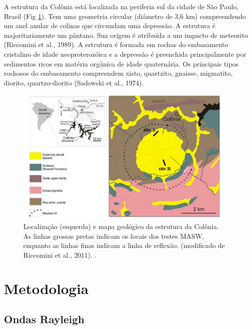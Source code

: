 \documentclass[smallextended]{svjour3}       %
\begin{document}
A estrutura da Colônia está localizada na periferia sul da cidade de São Paulo, Brasil (Fig \ref{geologia}). Tem uma geometria circular (diâmetro de 3,6 km) compreendendo um anel anular de colinas que circundam uma depressão. A estrutura é majoritariamente um pântano. Sua origem é atribuída a um impacto de meteorito (Riccomini et al., 1989). A estrutura é formada em rochas do embasamento cristalino de idade neoproterozóica e a depressão é preenchida principalmente por sedimentos ricos em matéria orgânica de idade quaternária. Os principais tipos rochosos do embasamento compreendem xisto, quartzito, gnaisse, migmatito, diorito, quartzo-diorito (Sadowski et al., 1974).

\begin{figure}[!hbtp]
  \begin{center}
  
  \includegraphics[scale=0.8]{Figures/fig1.png}
  \end{center}
  \caption{Localização (esquerda) e mapa geológico da estrutura da Colônia. As linhas grossas pretas indicam os locais dos testes MASW, enquanto as linhas finas indicam a linha de reflexão. (modificado de Riccomini et al., 2011). \citep{de2009filtragem}.}
  \label{geologia}
\end{figure}


\section{Metodologia}
\label{methods}

\subsection{Ondas Rayleigh}
\end{document}
